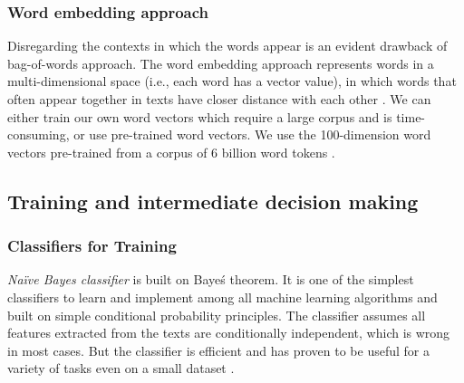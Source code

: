 \documentclass[11pt]{article}
\begin{document}
\subsubsection{Word embedding approach}

Disregarding the contexts in which the words appear is an evident drawback of bag-of-words approach. The word embedding approach represents words in a multi-dimensional space (i.e., each word has a vector value), in which words that often appear together in texts have closer distance with each other \parencites[][290]{JurafskySpeechLanguageProcessing2017}[][65]{BengfortAppliedTextAnalysis2018}. We can either train our own word vectors which require a large corpus and is time-consuming, or use pre-trained word vectors. We use the 100-dimension word vectors pre-trained from a corpus of 6 billion word tokens \parencite{PenningtonGloveGlobalVectors2014}.


\subsection{Training and intermediate decision making}

\subsubsection{Classifiers for Training}

\textit{Na\"ive Bayes classifier} is built on Baye\'s theorem. It is one of the simplest classifiers to learn and implement among all machine learning algorithms and built on simple conditional probability principles. The classifier assumes all features extracted from the texts are conditionally independent, which is wrong in most cases. But the classifier is efficient and has proven to be useful for a variety of tasks even on a small dataset \parencites[][76]{JurafskySpeechLanguageProcessing2017}[][277]{GrimmerTextDataPromise2013}.



\end{document}
